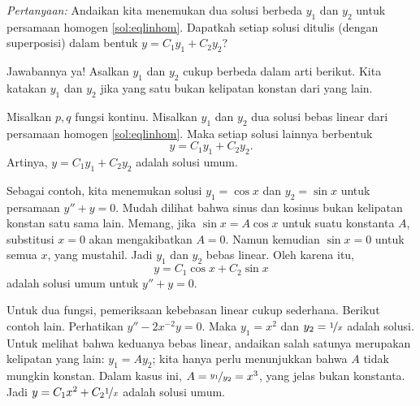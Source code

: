 \emph{Pertanyaan:} Andaikan kita menemukan dua solusi berbeda $y_1$ dan $y_2$ untuk persamaan homogen \eqref{sol:eqlinhom}. Dapatkah setiap solusi ditulis (dengan superposisi) dalam bentuk $y = C_1 y_1 + C_2 y_2$?

Jawabannya ya! Asalkan $y_1$ dan $y_2$ cukup berbeda dalam arti berikut. Kita katakan $y_1$ dan $y_2$ \emph{} jika yang satu bukan kelipatan konstan dari yang lain.

\begin{theorem}
Misalkan $p, q$ fungsi kontinu. Misalkan $y_1$ dan $y_2$ dua solusi bebas linear dari persamaan homogen \eqref{sol:eqlinhom}. Maka setiap solusi lainnya berbentuk
\begin{equation*}
y = C_1 y_1 + C_2 y_2 .
\end{equation*}
Artinya, $y = C_1 y_1 + C_2 y_2$ adalah solusi umum.
\end{theorem}

Sebagai contoh, kita menemukan solusi $y_1 = \cos x$ dan $y_2 = \sin x$ untuk persamaan $y'' + y = 0$. Mudah dilihat bahwa sinus dan kosinus bukan kelipatan konstan satu sama lain. Memang, jika $\sin x = A \cos x$ untuk suatu konstanta $A$, substitusi $x=0$ akan mengakibatkan $A = 0$. Namun kemudian $\sin x = 0$ untuk semua $x$, yang mustahil. Jadi $y_1$ dan $y_2$ bebas linear. Oleh karena itu,
\begin{equation*}
y = C_1 \cos x + C_2 \sin x
\end{equation*}
adalah solusi umum untuk $y'' + y = 0$.

Untuk dua fungsi, pemeriksaan kebebasan linear cukup sederhana. Berikut contoh lain. Perhatikan $y''-2x^{-2}y = 0$. Maka $y_1 = x^2$ dan $y_2 = \nicefrac{1}{x}$ adalah solusi. Untuk melihat bahwa keduanya bebas linear, andaikan salah satunya merupakan kelipatan yang lain: $y_1 = A y_2$; kita hanya perlu menunjukkan bahwa $A$ tidak mungkin konstan. Dalam kasus ini, $A = \nicefrac{y_1}{y_2} = x^3$, yang jelas bukan konstanta. Jadi $y = C_1 x^2 + C_2 \nicefrac{1}{x}$ adalah solusi umum.

\medskip

